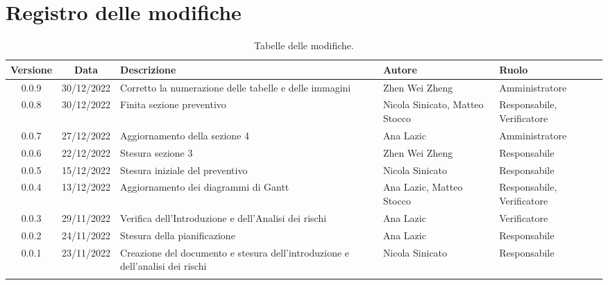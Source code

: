 \section*{Registro delle modifiche}
\begin{table}[H]
	\centering
	\renewcommand\tabularxcolumn[1]{>{\Centering}m{#1}}
	\begin{tabularx}{\textwidth}{| c | c | X | X | X |} 
	\hline
	\textbf{Versione} & \textbf{Data} & \textbf{Descrizione} & \textbf{Autore} & \textbf{Ruolo}\\
	\hline
	0.0.9 & 30/12/2022 & Corretto la numerazione delle tabelle e delle immagini & Zhen Wei Zheng & Amministratore\\
	\hline
	0.0.8 & 30/12/2022 & Finita sezione preventivo & Nicola Sinicato, Matteo Stocco & Responsabile, Verificatore\\
	\hline
	0.0.7 & 27/12/2022 & Aggiornamento della sezione 4 & Ana Lazic & Amministratore\\
	\hline
	0.0.6 & 22/12/2022 & Stesura sezione 3 & Zhen Wei Zheng & Responsabile\\
	\hline
	0.0.5 & 15/12/2022 & Stesura iniziale del preventivo & Nicola Sinicato & Responsabile\\
	\hline
	0.0.4 & 13/12/2022 & Aggiornamento dei diagrammi di Gantt & Ana Lazic, Matteo Stocco & Responsabile, Verificatore\\
	\hline
	0.0.3 & 29/11/2022 & Verifica dell'Introduzione e dell'Analisi dei rischi & Ana Lazic & Verificatore\\
	\hline
	0.0.2 & 24/11/2022 & Stesura della pianificazione & Ana Lazic & Responsabile\\
	\hline
	0.0.1 & 23/11/2022 & Creazione del documento e stesura dell'introduzione e dell'analisi dei rischi & Nicola Sinicato & Responsabile\\
 	\hline
\caption{Tabelle delle modifiche.}
	\end{tabularx}
	\vspace{10pt}
\end{table}
